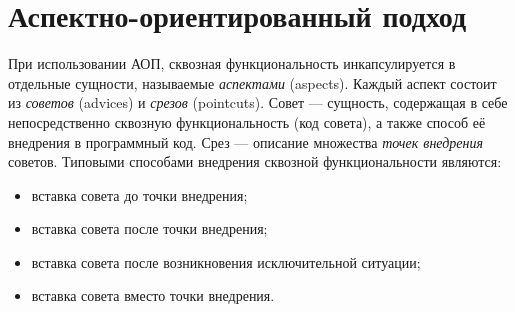 \documentclass[conference]{IEEEtran}
\begin{document}


\section{Аспектно-ориентированный подход}

При использовании АОП, сквозная функциональность инкапсулируется в отдельные 
сущности, называемые \textit{аспектами} (aspects).
Каждый аспект состоит из \textit{советов} (advices) и \textit{срезов}
(pointcuts). 
Совет --- сущность, содержащая в себе непосредственно сквозную функциональность
(код совета), а также способ её внедрения в программный код.
Срез --- описание множества \textit{точек внедрения} советов. 
Типовыми способами внедрения сквозной функциональности являются:
\begin{itemize}
     \item вставка совета до точки внедрения;
     \item вставка совета после точки внедрения;
     \item вставка совета после возникновения исключительной ситуации;
     \item вставка совета вместо точки внедрения.
\end{itemize}
\end{document}
